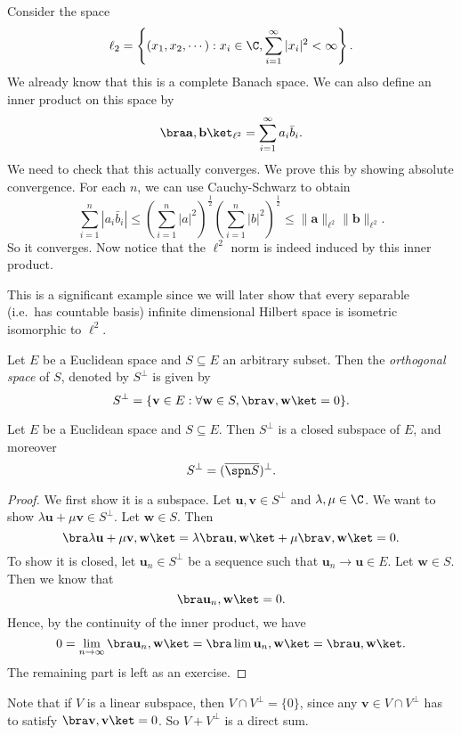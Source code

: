 \documentclass[a4paper]{article}
\begin{document}
\begin{eg}
  Consider the space
  \[
    \ell_2 = \left\{(x_1, x_2, \cdots): x_i \in \C, \sum_{i = 1}^\infty |x_i|^2 < \infty \right\}.
  \]
  We already know that this is a complete Banach space. We can also define an inner product on this space by
  \[
    \bra \mathbf{a}, \mathbf{b}\ket_{\ell^2} = \sum_{i = 1}^\infty a_i \bar{b}_i.
  \]
  We need to check that this actually converges. We prove this by showing absolute convergence. For each $n$, we can use Cauchy-Schwarz to obtain
  \[
    \sum_{i = 1}^n |a_i \bar{b}_i| \leq \left(\sum_{i = 1}^n|a|^2\right)^{\frac{1}{2}}\left(\sum_{i = 1}^n|b|^2\right)^{\frac{1}{2}} \leq \|\mathbf{a}\|_{\ell^2} \|\mathbf{b}\|_{\ell^2}.
  \]
  So it converges. Now notice that the $\ell^2$ norm is indeed induced by this inner product.
\end{eg}
This is a significant example since we will later show that every separable (i.e.\ has countable basis) infinite dimensional Hilbert space is isometric isomorphic to $\ell^2$.

\begin{defi}
  Let $E$ be a Euclidean space and $S\subseteq E$ an arbitrary subset. Then the \emph{orthogonal space} of $S$, denoted by $S^{\perp}$ is given by
  \[
    S^{\perp} = \{\mathbf{v} \in E: \forall \mathbf{w} \in S, \bra \mathbf{v}, \mathbf{w} \ket = 0\}.
  \]
\end{defi}

\begin{prop}
  Let $E$ be a Euclidean space and $S\subseteq E$. Then $S^\perp$ is a closed subspace of $E$, and moreover
  \[
    S^{\perp} = (\overline{\spn S})^{\perp}.
  \]
\end{prop}

\begin{proof}
  We first show it is a subspace. Let $\mathbf{u}, \mathbf{v} \in S^\perp$ and $\lambda, \mu \in \C$. We want to show $\lambda \mathbf{u} + \mu \mathbf{v} \in S^\perp$. Let $\mathbf{w} \in S$. Then
  \[
    \bra \lambda \mathbf{u} + \mu \mathbf{v}, \mathbf{w}\ket = \lambda \bra \mathbf{u}, \mathbf{w}\ket + \mu \bra \mathbf{v}, \mathbf{w}\ket = 0.
  \]
  To show it is closed, let $\mathbf{u}_n \in S^\perp$ be a sequence such that $\mathbf{u}_n \to \mathbf{u} \in E$. Let $\mathbf{w} \in S$. Then we know that
  \[
    \bra \mathbf{u}_n, \mathbf{w}\ket = 0.
  \]
  Hence, by the continuity of the inner product, we have
  \[
    0 = \lim_{n \to \infty} \bra \mathbf{u}_n, \mathbf{w}\ket = \bra \lim \mathbf{u}_n, \mathbf{w}\ket = \bra \mathbf{u}, \mathbf{w}\ket.
  \]
  The remaining part is left as an exercise. %
\end{proof}
Note that if $V$ is a linear subspace, then $V \cap V^\perp = \{0\}$, since any $\mathbf{v} \in V \cap V^\perp$ has to satisfy $\bra \mathbf{v}, \mathbf{v}\ket = 0$. So $V + V^\perp$ is a direct sum.
\end{document}
